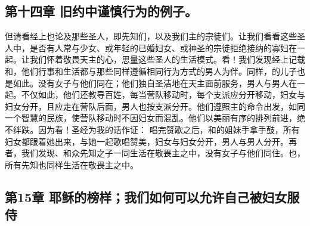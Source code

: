 
\subsection{第十四章 旧约中谨慎行为的例子。}

但请看经上也论及那些圣人，即先知们，以及我们主的宗徒们。让我们看看这些圣人中，是否有人常与少女、或年轻的已婚妇女、或神圣的宗徒拒绝接纳的寡妇在一起。让我们怀着敬畏天主的心，思量这些圣人的生活模式。看！我们发现经上记载和，他们行事和生活都与那些同样遵循相同行为方式的男人为伴。同样，的儿子也是如此。没有女子与他们同在；他们独自圣洁地在天主面前服务，男人与男人在一起。不仅如此，他们还教导百姓，每当营队移动时，每个支派应分开移动，妇女与妇女分开，且应走在营队后面，男人也按支派分开。他们遵照主的命令出发，如同一个智慧的民族，使营队移动时不因妇女而混乱。他们以美丽有序的排列前进，绝不绊跌。因为看！圣经为我的话作证：\newline{} 唱完赞歌之后，和的姐妹手拿手鼓，所有妇女都跟着她出来，与她一起歌唱赞美，妇女与妇女分开，男人与男人分开。再者，我们发现、和众先知之子一同生活在敬畏主之中，没有女子与他们同住。也，所有先知也同样生活在敬畏主之中。\par


\subsection{第15章 耶稣的榜样；我们如何可以允许自己被妇女服侍}

